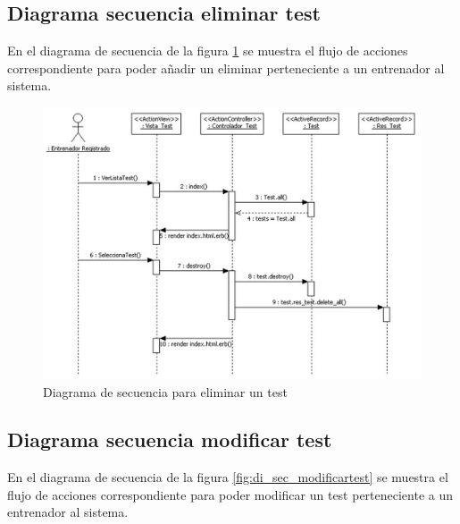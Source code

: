 		  \newpage
		
		\subsection{Diagrama secuencia eliminar test} %
		  \label{sub:diagrama_secuencia_eliminar_test}
		
		  En el diagrama de secuencia de la figura \ref{fig:di_sec_eliminartest} se muestra el flujo de acciones correspondiente para poder añadir un eliminar perteneciente a un entrenador al sistema.
		  
		  \begin{figure}[H]
			  \centering
			    \includegraphics[width=15cm]{./eps/di_diagsecuencia/Test_Eliminar.eps}
			  \caption{Diagrama de secuencia para eliminar un test}
			  \label{fig:di_sec_eliminartest}
			\end{figure}
			
			\newpage
		
		\subsection{Diagrama secuencia modificar test} %
		  \label{sub:diagrama_secuencia_modificar_test}
		
		  En el diagrama de secuencia de la figura \ref{fig:di_sec_modificartest} se muestra el flujo de acciones correspondiente para poder modificar un test perteneciente a un entrenador al sistema.
		  
